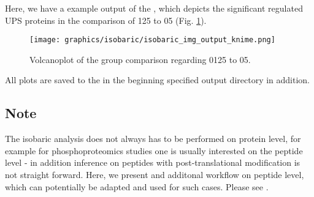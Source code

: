 \noindent  Here, we have a example output of the , which depicts the significant regulated  UPS proteins in the comparison of 125 to 05 (Fig. \ref{fig:isobaric_volcanoplot}). 

\begin{figure}[htbp]
  \centering
 \texttt{[image: graphics/isobaric/isobaric\_img\_output\_knime.png]}
  \caption{Volcanoplot of the group comparison regarding 0125 to 05.}
  \label{fig:isobaric_volcanoplot}
\end{figure}

\noindent  All plots are saved to the in the beginning specified output directory in addition. 

\subsection{Note}
The isobaric analysis does not always has to be performed on protein level, for example for phosphoproteomics studies one is usually  interested on the peptide level - in addition inference on peptides with post-translational modification is not straight forward. Here, we present and additonal workflow on peptide level, which can potentially be adapted and used for such cases. 
Please see .




